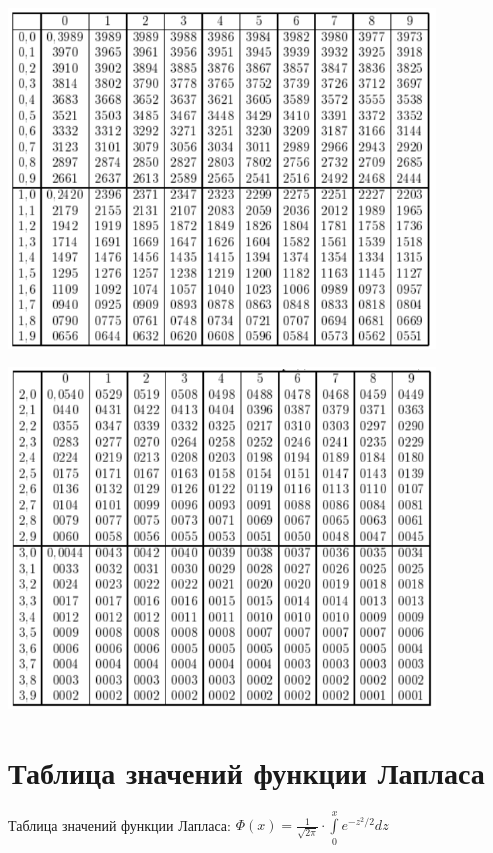 \documentclass[12pt,a4paper]{article}
\theoremstyle{definition}
\theoremstyle{definition}
\theoremstyle{remark}
\theoremstyle{corollary}
\theoremstyle{bolditalic}
\begin{document}
\begin{center}
  \includegraphics[width=0.85\textwidth]{images/gauss-table-1.png}
\end{center}
\begin{center}
  \includegraphics[width=0.85\textwidth]{images/gauss-table-2.png}
\end{center}

\newpage
\section{Таблица значений функции Лапласа}

Таблица значений функции Лапласа: $\Phi(x) = \frac{1}{\sqrt{2\pi}}\cdot \int\limits_{0}^{x} e^{-z^2/2}dz$
\end{document}
